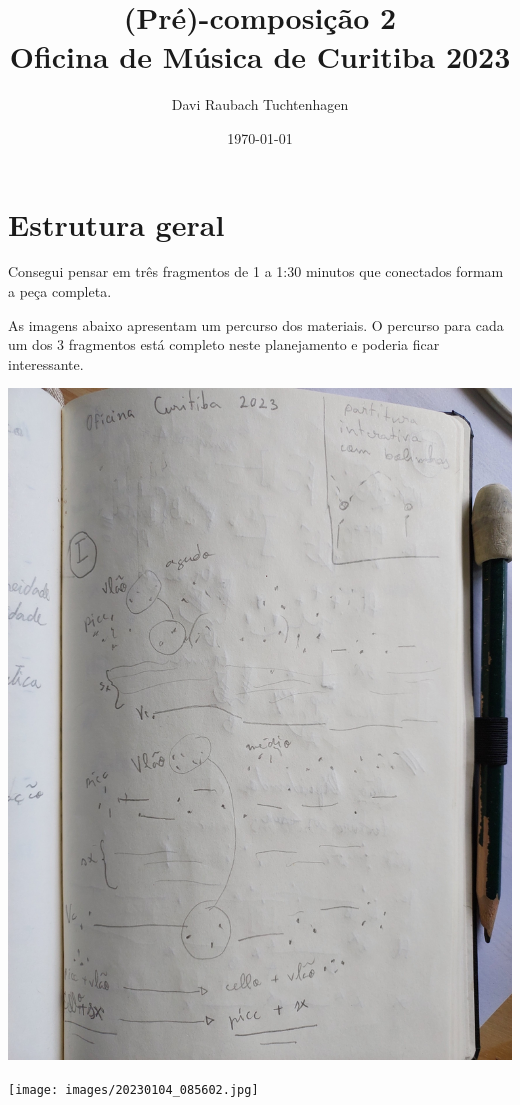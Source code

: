 \documentclass[a4paper, 12pt]{article}
\author{Davi Raubach Tuchtenhagen}
\date{\today}
\title{(Pré)-composição 2\\\medskip
\large Oficina de Música de Curitiba 2023}
\begin{document}
\maketitle

\section*{Estrutura geral}
\label{sec:org6ee895d}
Consegui pensar em três fragmentos de 1 a 1:30 minutos que conectados formam a peça completa.

As imagens abaixo apresentam um percurso dos materiais. O percurso para cada um dos 3 fragmentos está completo neste planejamento e poderia ficar interessante.

\begin{center}
\includegraphics[width=.9\linewidth]{images/20230104_085554.jpg}
\end{center}

\begin{center}
\texttt{[image: images/20230104\_085602.jpg]}
\end{center}
\end{document}
